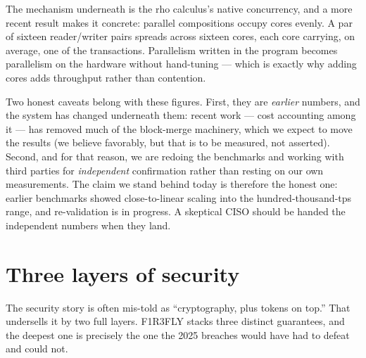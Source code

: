 \documentclass[11pt]{article}
\begin{document}
The mechanism underneath is the rho calculus's native concurrency, and a more recent result makes it concrete: parallel compositions occupy cores evenly. A par of sixteen reader/writer pairs spreads across sixteen cores, each core carrying, on average, one of the transactions. Parallelism written in the program becomes parallelism on the hardware without hand-tuning --- which is exactly why adding cores adds throughput rather than contention.

Two honest caveats belong with these figures. First, they are \emph{earlier} numbers, and the system has changed underneath them: recent work --- cost accounting among it --- has removed much of the block-merge machinery, which we expect to move the results (we believe favorably, but that is to be measured, not asserted). Second, and for that reason, we are redoing the benchmarks and working with third parties for \emph{independent} confirmation rather than resting on our own measurements. The claim we stand behind today is therefore the honest one: earlier benchmarks showed close-to-linear scaling into the hundred-thousand-tps range, and re-validation is in progress. A skeptical CISO should be handed the independent numbers when they land.

\section{Three layers of security}

The security story is often mis-told as ``cryptography, plus tokens on top.'' That undersells it by two full layers. F1R3FLY stacks three distinct guarantees, and the deepest one is precisely the one the 2025 breaches would have had to defeat and could not.
\end{document}
